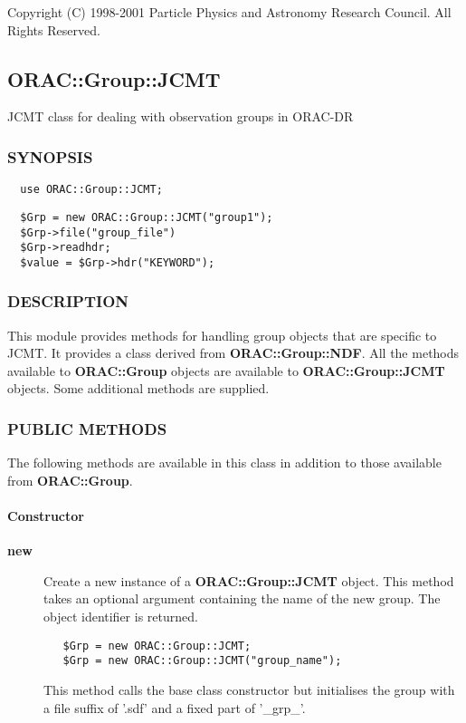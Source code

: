Copyright (C) 1998-2001 Particle Physics and Astronomy Research
Council. All Rights Reserved.

\subsection{ORAC::Group::JCMT\label{ORAC::Group::JCMT}}


JCMT class for dealing with observation groups in ORAC-DR

\subsubsection*{SYNOPSIS\label{ORAC::Group::JCMT_SYNOPSIS}}
\begin{verbatim}
  use ORAC::Group::JCMT;
\end{verbatim}
\begin{verbatim}
  $Grp = new ORAC::Group::JCMT("group1");
  $Grp->file("group_file")
  $Grp->readhdr;
  $value = $Grp->hdr("KEYWORD");
\end{verbatim}
\subsubsection*{DESCRIPTION\label{ORAC::Group::JCMT_DESCRIPTION}}


This module provides methods for handling group objects that
are specific to JCMT. It provides a class derived from \textbf{ORAC::Group::NDF}.
All the methods available to \textbf{ORAC::Group} objects are available
to \textbf{ORAC::Group::JCMT} objects. Some additional methods are supplied.

\subsubsection*{PUBLIC METHODS\label{ORAC::Group::JCMT_PUBLIC_METHODS}}


The following methods are available in this class in addition to
those available from \textbf{ORAC::Group}.

\paragraph*{Constructor\label{ORAC::Group::JCMT_Constructor}}
\begin{description}

\item[\textbf{new}] \mbox{}

Create a new instance of a \textbf{ORAC::Group::JCMT} object.
This method takes an optional argument containing the
name of the new group. The object identifier is returned.

\begin{verbatim}
   $Grp = new ORAC::Group::JCMT;
   $Grp = new ORAC::Group::JCMT("group_name");
\end{verbatim}


This method calls the base class constructor but initialises
the group with a file suffix of '.sdf' and a fixed part
of '\_grp\_'.

\end{description}
